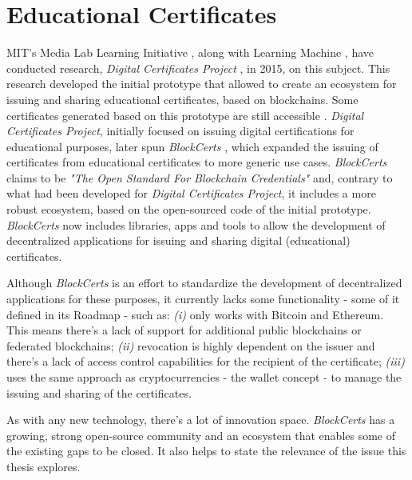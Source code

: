 \section{Educational Certificates}
\label{sec:related-ec}

MIT's Media Lab Learning Initiative \cite{mit_learning_initiative}, along with Learning Machine \cite{learning_machine}, have conducted research, \textit{Digital Certificates Project} \cite{MITCertificates}, in 2015, on this subject. This research developed the initial prototype that allowed to create an ecosystem for issuing and sharing educational certificates, based on blockchains. Some certificates generated based on this prototype are still accessible \cite{MITCertificatesBootcamp}. \textit{Digital Certificates Project}, initially focused on issuing digital certifications for educational purposes, later spun \textit{BlockCerts} \cite{Blockcerts}, which expanded the issuing of certificates from educational certificates to more generic use cases. \textit{BlockCerts} claims to be \textit{"The Open Standard For Blockchain Credentials"} and, contrary to what had been developed for \textit{Digital Certificates Project}, it includes a more robust ecosystem, based on the open-sourced code of the initial prototype. \textit{BlockCerts} now includes libraries, apps and tools to allow the development of decentralized  applications for issuing and sharing digital (educational) certificates.

Although \textit{BlockCerts} is an effort to standardize the development of decentralized applications for these purposes, it currently lacks some functionality - some of it defined in its Roadmap - such as: \emph{(i)} only works with Bitcoin and Ethereum. This means there's a lack of support for additional public blockchains or federated blockchains; \emph{(ii)} revocation is highly dependent on the issuer and there's a lack of access control capabilities for the recipient of the certificate; \emph{(iii)} uses the same approach as cryptocurrencies - the wallet concept - to manage the issuing and sharing of the certificates.

As with any new technology, there's a lot of innovation space. \textit{BlockCerts} has a growing, strong open-source community and an ecosystem that enables some of the existing gaps to be closed. It also helps to state the relevance of the issue this thesis explores.

